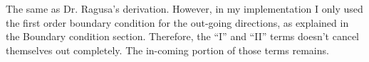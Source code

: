 \documentclass{article}
\begin{document}
The same as Dr. Ragusa's derivation. However, in my implementation I only used the first order boundary condition for the out-going directions, as explained in the Boundary condition section. Therefore, the ``I'' and ``II'' terms doesn't cancel themselves out completely. The in-coming portion of those terms remains.

\end{document}
